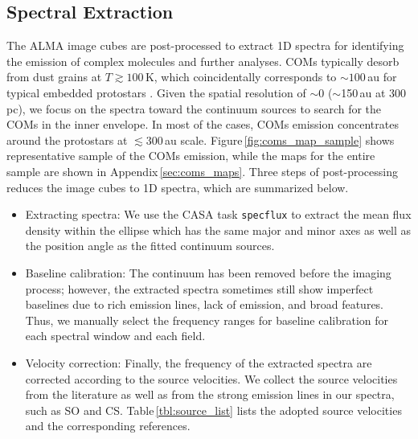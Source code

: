 \documentclass[twocolumn]{aastex62}
\begin{document}
\subsection{Spectral Extraction}
The ALMA image cubes are post-processed to extract 1D spectra for identifying the emission of complex molecules and further analyses.  COMs typically desorb from dust grains at $T \gtrsim 100$\,K, which coincidentally corresponds to $\sim 100$\,au for typical embedded protostars \citep[e.g., ][]{2020ApJ...891...61Y}.  Given the spatial resolution of $\sim$0 ($\sim$150\,au at 300\,pc), we focus on the spectra toward the continuum sources to search for the COMs in the inner envelope.  In most of the cases, COMs emission concentrates around the protostars at $\lesssim$300\,au scale.  Figure\,\ref{fig:coms_map_sample} shows representative sample of the COMs emission, while the maps for the entire sample are shown in Appendix\,\ref{sec:coms_maps}.  Three steps of post-processing reduces the image cubes to 1D spectra, which are summarized below.

\begin{itemize}
  \item Extracting spectra:  We use the CASA task \texttt{specflux} to extract the mean flux density within the ellipse which has the same major and minor axes as well as the position angle as the fitted continuum sources.
  \item Baseline calibration:  The continuum has been removed before the imaging process; however, the extracted spectra sometimes still show imperfect baselines due to rich emission lines, lack of emission, and broad features.  Thus, we manually select the frequency ranges for baseline calibration for each spectral window and each field.
  \item Velocity correction:  Finally, the frequency of the extracted spectra are corrected according to the source velocities.  We collect the source velocities from the literature as well as from the strong emission lines in our spectra, such as SO and CS.  Table\,\ref{tbl:source_list} lists the adopted source velocities and the corresponding references.
\end{itemize}
\end{document}
